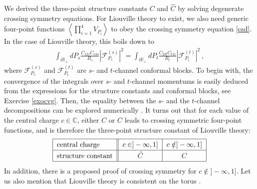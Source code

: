 \documentclass[12pt, a4paper, notitlepage, twoside]{report}
\numberwithin{equation}{section}
\theoremstyle{break}
\begin{document}
We derived the three-point structure constants $C$ and $\hat C$ by solving degenerate crossing symmetry equations. 
For Liouville theory to exist, we also need generic four-point functions $\left< \prod_{i=1}^4 V_{P_i}\right>$ to obey the crossing symmetry equation \eqref{csd}. In the case of Liouville theory, this boils down to 
\begin{align}
 \int_{i\mathbb{R}_+} dP_s \frac{C_{12s}C_{s34}}{B_s} \left|\mathcal{F}_{P_s}^{(s)} \right|^2 = \int_{i\mathbb{R}_+} dP_t \frac{C_{23t}C_{t41}}{B_t} \left|\mathcal{F}_{P_t}^{(t)} \right|^2\ ,
\end{align}
where $\mathcal{F}_{P_s}^{(s)}$ and $\mathcal{F}_{P_t}^{(t)}$ are $s$- and $t$-channel conformal blocks.
To begin with, the convergence of the integrals over $s$- and $t$-channel momentums is easily deduced from the expressions for the structure constants and conformal blocks, see Exercise \ref{exocvg}.
Then, the equality between the $s$- and the $t$-channel decompositions can be explored numerically \cite{rs15}. 
It turns out that for each value of the central charge $c\in\mathbb{C}$, either $C$ or $\hat C$ leads to crossing symmetric four-point functions, and is therefore the three-point structure constant of Liouville theory:
\begin{align}
\renewcommand{\arraystretch}{1.3}
 \begin{tabular}{|l||c|c|}
  \hline
  central charge &  $c\in ]-\infty, 1]$ & $c\notin ]-\infty, 1]$
  \\
  \hline
  structure constant & $\hat C$  & $C$ 
  \\
  \hline
 \end{tabular}
 \label{ccr}
\end{align}
In addition, there is a proposed proof \cite{tes03b} of crossing symmetry for $c\notin ]-\infty, 1]$.
Let us also mention that Liouville theory is consistent on the torus \cite{hjs09, rs15}. 
\end{document}
